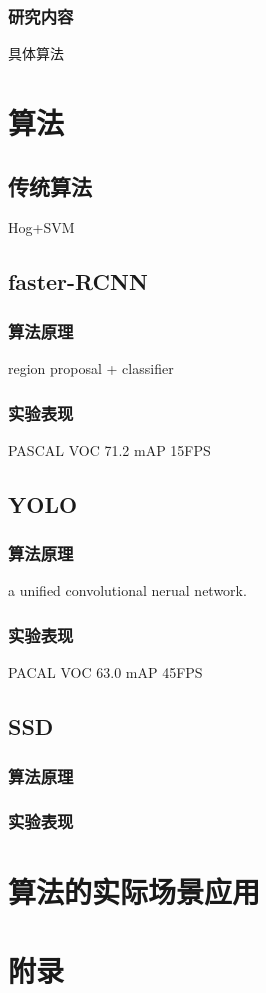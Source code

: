 \documentclass[12pt,a4paper,titlepage]{article}
\begin{document}
\subsubsection{研究内容}
具体算法

\section{算法}
\subsection{传统算法}
Hog+SVM
\subsection{faster-RCNN}
\subsubsection{算法原理}
region proposal + classifier
\subsubsection{实验表现}
PASCAL VOC 71.2 mAP   15FPS
\subsection{YOLO}
\subsubsection{算法原理}
a unified convolutional nerual network.
\subsubsection{实验表现}
PACAL VOC 63.0 mAP    45FPS
\subsection{SSD}
\subsubsection{算法原理}
\subsubsection{实验表现}


\section{算法的实际场景应用}

\section{附录}
\end{document}
